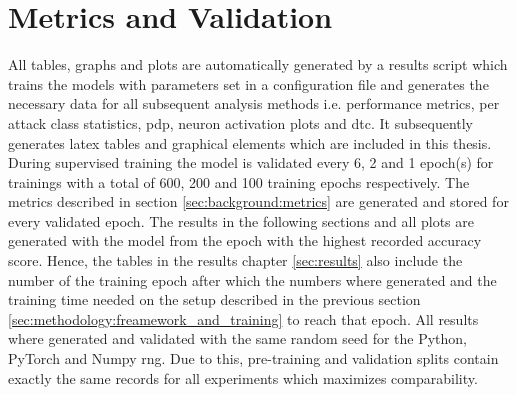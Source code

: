 \section{Metrics and Validation}

All tables, graphs and plots are automatically generated by a results script which trains the models with parameters set in a configuration file and generates the necessary data for all subsequent analysis methods i.e. performance metrics, per attack class statistics, \gls{pdp}, neuron activation plots and \gls{dtc}. It subsequently generates latex tables and graphical elements which are included in this thesis. During supervised training the model is validated every 6, 2 and 1 epoch(s) for trainings with a total of 600, 200 and 100 training epochs respectively. The metrics described in section \ref{sec:background:metrics} are generated and stored for every validated epoch. The results in the following sections and all plots are generated with the model from the epoch with the highest recorded accuracy score. Hence, the tables in the results chapter \ref{sec:results} also include the number of the training epoch after which the numbers where generated and the training time needed on the setup described in the previous section \ref{sec:methodology:freamework_and_training} to reach that epoch.
All results where generated and validated with the same random seed for the Python, PyTorch and Numpy \gls{rng}. Due to this, pre-training and validation splits contain exactly the same records for all experiments which maximizes comparability. 
\newpage